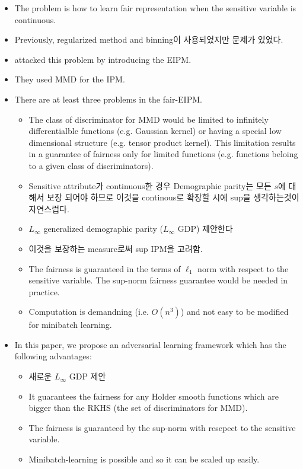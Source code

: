 \documentclass{article}
\begin{document}
\begin{itemize}
 \item The problem is how to  learn fair representation when the sensitive variable is continuous.
 \item Previously, regularized method and binning이 사용되었지만 문제가 있었다.
 \item \cite{kong2025fair} attacked this problem by introducing the EIPM.
 \item They used MMD for the IPM.
 \item There are at least three problems in the fair-EIPM.
   \begin{itemize}
     \item The class of discriminator for MMD would be limited to infinitely differentialble functions
     (e.g. Gaussian kernel)  or having a special low dimensional structure (e.g. tensor product kernel).
     This limitation results in a guarantee of fairness only for limited functions (e.g. functions beloing
     to a given class of discriminators). 
     \item Sensitive attribute가 continuous한 경우 Demographic parity는 모든 $s$에 대해서 보장 되어야 하므로 이것을 continous로 확장할 시에 sup을 생각하는것이 자연스럽다.
     \item $L_{\infty}$ generalized demographic parity ($L_{\infty}$ GDP) 제안한다
     \item 이것을 보장하는 measure로써 sup IPM을 고려함.
     \item The fairness is guaranteed in the terms of $\ell_1$ norm with respect to the sensitive variable.
      The sup-norm fairness guarantee would be needed in practice.
      \item Computation is demandning (i.e. $O(n^3)$) and not easy to be modified for minibatch learning.
   \end{itemize}
 \item In this paper, we propose an adversarial learning framework which has the following advantages:
   \begin{itemize}
   \item 새로운 $L_{\infty}$ GDP 제안
       \item It guarantees the fairness for any Holder smooth functions which are bigger than the RKHS (the
       set of discriminators for MMD).
       \item The fairness is guaranteed by the sup-norm with resepect to the sensitive variable. 
       \item Minibatch-learning is possible and so it can be scaled up easily.
   \end{itemize}
\end{itemize}
\end{document}
